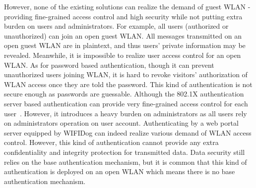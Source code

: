However, none of the existing solutions can realize the demand of guest WLAN - providing fine-grained access control and high security while not putting extra burden on users and administrators. For example, all users (authorized or unauthorized) can join an open guest WLAN. All messages transmitted on an open guest WLAN are in plaintext, and thus users’ private information may be revealed. Meanwhile, it is impossible to realize user access control for an open WLAN. As for password based authentication, though it can prevent unauthorized users joining WLAN, it is hard to revoke visitors’ authorization of WLAN access once they are told the password. This kind of authentication is not secure enough as passwords are guessable. Although the 802.1X authentication server based authentication can provide very fine-grained access control for each user~\cite{ Afia2007Comparative}. However, it introduces a heavy burden on administrators as all users rely on administrators operation on user account. Authenticating by a web portal server equipped by WIFIDog can indeed realize various demand of WLAN access control. However, this kind of authentication cannot provide any extra confidentiality and integrity protection for transmitted data. Data security still relies on the base authentication mechanism, but it is common that this kind of authentication is deployed on an open WLAN which means there is no base authentication mechanism. 


